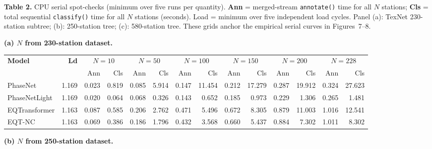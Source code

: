 \clearpage
\begin{landscape}

\begin{center}
\textbf{Table 2.} CPU serial spot-checks (minimum over five runs per quantity). \textbf{Ann} = merged-stream \texttt{annotate()} time for all \(N\) stations; \textbf{Cls} = total sequential \texttt{classify()} time for all \(N\) stations (seconds). Load = minimum over five independent load cycles. Panel (a): TexNet 230-station subtree; (b): 250-station tree; (c): 580-station tree. These grids anchor the empirical serial curves in Figures~7--8.

\vspace{0.6em}
\scriptsize
\textbf{(a) \(N\) from 230-station dataset.}

\begin{tabular}{l r rrrrrrrrrrrr}
\toprule
\textbf{Model} & \textbf{Ld} & \multicolumn{2}{c}{\(N{=}10\)} & \multicolumn{2}{c}{\(N{=}50\)} & \multicolumn{2}{c}{\(N{=}100\)} & \multicolumn{2}{c}{\(N{=}150\)} & \multicolumn{2}{c}{\(N{=}200\)} & \multicolumn{2}{c}{\(N{=}228\)} \\
 & & Ann & Cls & Ann & Cls & Ann & Cls & Ann & Cls & Ann & Cls & Ann & Cls \\
\midrule
PhaseNet & 1.169 & 0.023 & 0.819 & 0.085 & 5.914 & 0.147 & 11.454 & 0.212 & 17.279 & 0.287 & 19.912 & 0.324 & 27.623 \\
PhaseNetLight & 1.169 & 0.020 & 0.064 & 0.068 & 0.326 & 0.143 & 0.652 & 0.185 & 0.973 & 0.229 & 1.306 & 0.265 & 1.481 \\
EQTransformer & 1.163 & 0.087 & 0.585 & 0.206 & 2.762 & 0.471 & 5.496 & 0.672 & 8.305 & 0.879 & 11.003 & 1.016 & 12.541 \\
EQT-NC & 1.163 & 0.069 & 0.386 & 0.186 & 1.796 & 0.432 & 3.568 & 0.660 & 5.437 & 0.884 & 7.302 & 1.011 & 8.302 \\
\bottomrule
\end{tabular}

\vspace{1em}
\textbf{(b) \(N\) from 250-station dataset.}


\end{center}
\end{landscape}
